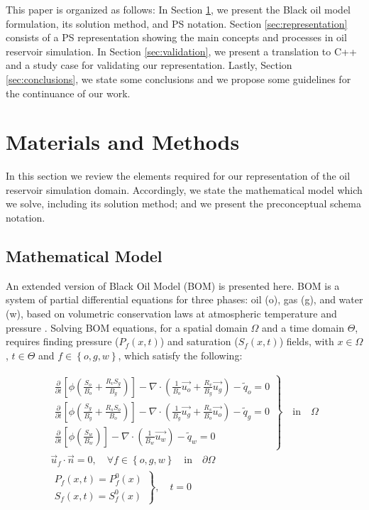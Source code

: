 \documentclass[review]{elsarticle}
\begin{document}
This paper is organized as follows: In Section \ref{sec:conceptual_frame}, we present the Black oil model formulation, its solution method, and PS notation. Section \ref{sec:representation} consists of a PS representation showing the main concepts and processes in oil reservoir simulation. In Section \ref{sec:validation}, we present a translation to C++ and a study case for validating our representation. Lastly, Section \ref{sec:conclusions}, we state some conclusions and we propose some guidelines for the continuance of our work.  

\section{Materials and Methods}\label{sec:conceptual_frame}
In this section we review the elements required for our representation of the oil reservoir simulation domain. Accordingly, we state the mathematical model which we solve, including its solution method; and we present the preconceptual schema notation.

\subsection{Mathematical Model}
An extended version of Black Oil Model (BOM) is presented here. BOM is a system of partial differential equations for three phases: oil (o), gas (g), and water (w), based on volumetric conservation laws at atmospheric temperature and pressure \cite{jamal2006petroleum,Bear2018,chen2007reservoir, ertekin2001basic}. Solving BOM equations, for a spatial domain $\Omega$ and a time domain $\Theta$, requires finding pressure ($P_{f}(x,t)$) and saturation ($S_{f}(x,t)$) fields, with $x \in \Omega$, $t \in \Theta$ and $f \in \left\lbrace o,g,w\right\rbrace $, which satisfy the following:

\begin{align}
\left.
\begin{array}{l}
\frac{\partial}{\partial t} \left[ \phi \left( \frac{S_{o}}{B_{o}} + \frac{R_{v} S_{g}}{B_{g}} \right) \right]
- \nabla \cdot \left( \frac{1}{B_{o}} \vec{u_{o}} + \frac{R_{v}}{B_{g}} \vec{u_{g}} \right) - \tilde{q}_{o}=0  \\
\frac{\partial}{\partial t} \left[ \phi \left( \frac{S_{g}}{B_{g}} + \frac{R_{s} S_{o}}{B_{o}} \right) \right]
- \nabla \cdot \left( \frac{1}{B_{g}} \vec{u_{g}} + \frac{R_{s}}{B_{o}} \vec{u_{o}} \right) - \tilde{q}_{g} = 0\\
\frac{\partial}{\partial t} \left[\phi \left( \frac{S_{w}}{B_{w}} \right) \right] - \nabla \cdot \left( \frac{1}{B_{w}} \vec{u_{w}} \right) - \tilde{q}_{w} = 0
\end{array}
\right \rbrace  \quad \text{in} \quad \Omega\\
\vec{u}_{f} \cdot \vec{n} = 0, \quad \forall f \in \left\lbrace o,g,w\right\rbrace \quad \text{in} \quad \partial \Omega \\
\left.
\begin{array}{l}
P_{f}(x,t) = P^{0}_{f}(x)  \\
S_{f}(x,t) = S^{0}_{f}(x)\end{array}
\right \rbrace , \quad t=0
\end{align}
\end{document}
